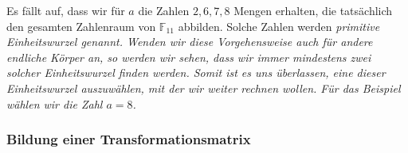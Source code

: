 Es fällt auf, dass wir für $a$ die Zahlen $2,6,7,8$ Mengen erhalten, die tatsächlich den gesamten Zahlenraum von $\mathbb{F}_{11}$ abbilden. Solche Zahlen werden \em primitive Einheitswurzel \em genannt. 
Wenden wir diese Vorgehensweise auch für andere endliche Körper an, so werden wir sehen, dass wir immer mindestens zwei solcher Einheitswurzel finden werden. Somit ist es uns überlassen, eine dieser Einheitswurzel auszuwählen, mit der wir weiter rechnen wollen. Für das Beispiel wählen wir die Zahl $a = 8$.

\subsubsection{Bildung einer Transformationsmatrix
	\label{reedsolomon:subsection:transMat}}
%

